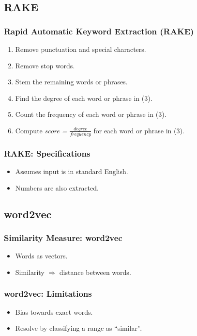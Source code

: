 \documentclass{beamer}
\begin{document}
\subsection{RAKE}
\begin{frame}
\frametitle{Rapid Automatic Keyword Extraction (RAKE)}
\begin{enumerate}
\item Remove punctuation and special characters.
\item Remove stop words.
\item Stem the remaining words or phrases.
\item Find the degree of each word or phrase in (3).
\item Count the frequency of each word or phrase in (3).
\item Compute \textit{score = $ \frac{degree}{frequency} $} for each word or phrase in (3).
\end{enumerate}
\end{frame}

\begin{frame}
\frametitle{RAKE: Specifications}
\begin{itemize}
\item Assumes input is in standard English.
\item Numbers are also extracted.
\end{itemize}
\end{frame}

\subsection{word2vec}
\begin{frame}
\frametitle{Similarity Measure: word2vec}
\begin{itemize}
\item Words as vectors.
\item Similarity $ \Rightarrow $ distance between words.
\end{itemize}
\end{frame}

\begin{frame}
\frametitle{word2vec: Limitations}
\begin{itemize}
\item Bias towards exact words.
\item Resolve by classifying a range as ``similar".
\end{itemize}
\end{frame}
\end{document}
